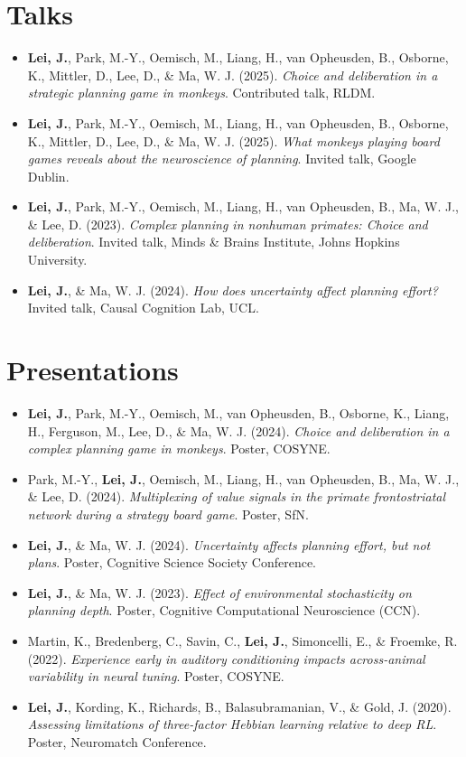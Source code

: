 \documentclass[10pt]{article}
\begin{document}
\section{Talks}
\begin{itemize}
    \item \textbf{Lei, J.}, Park, M.-Y., Oemisch, M., Liang, H., van Opheusden, B., Osborne, K., Mittler, D., Lee, D., \& Ma, W. J. (2025). \textit{Choice and deliberation in a strategic planning game in monkeys}. Contributed talk, RLDM.
    \item \textbf{Lei, J.}, Park, M.-Y., Oemisch, M., Liang, H., van Opheusden, B., Osborne, K., Mittler, D., Lee, D., \& Ma, W. J. (2025). \textit{What monkeys playing board games reveals about the neuroscience of planning}. Invited talk, Google Dublin.
    \item \textbf{Lei, J.}, Park, M.-Y., Oemisch, M., Liang, H., van Opheusden, B., Ma, W. J., \& Lee, D. (2023). \textit{Complex planning in nonhuman primates: Choice and deliberation}. Invited talk, Minds \& Brains Institute, Johns Hopkins University.
    \item \textbf{Lei, J.}, \& Ma, W. J. (2024). \textit{How does uncertainty affect planning effort?} Invited talk, Causal Cognition Lab, UCL.
\end{itemize}

\section{Presentations}
\begin{itemize}
    \item \textbf{Lei, J.}, Park, M.-Y., Oemisch, M., van Opheusden, B., Osborne, K., Liang, H., Ferguson, M., Lee, D., \& Ma, W. J. (2024). \textit{Choice and deliberation in a complex planning game in monkeys}. Poster, COSYNE.
    \item Park, M.-Y., \textbf{Lei, J.}, Oemisch, M., Liang, H., van Opheusden, B., Ma, W. J., \& Lee, D. (2024). \textit{Multiplexing of value signals in the primate frontostriatal network during a strategy board game}. Poster, SfN.
    \item \textbf{Lei, J.}, \& Ma, W. J. (2024). \textit{Uncertainty affects planning effort, but not plans}. Poster, Cognitive Science Society Conference.
    \item \textbf{Lei, J.}, \& Ma, W. J. (2023). \textit{Effect of environmental stochasticity on planning depth}. Poster, Cognitive Computational Neuroscience (CCN).
    \item Martin, K., Bredenberg, C., Savin, C., \textbf{Lei, J.}, Simoncelli, E., \& Froemke, R. (2022). \textit{Experience early in auditory conditioning impacts across-animal variability in neural tuning}. Poster, COSYNE.
    \item \textbf{Lei, J.}, Kording, K., Richards, B., Balasubramanian, V., \& Gold, J. (2020). \textit{Assessing limitations of three-factor Hebbian learning relative to deep RL}. Poster, Neuromatch Conference.
\end{itemize}
\end{document}
